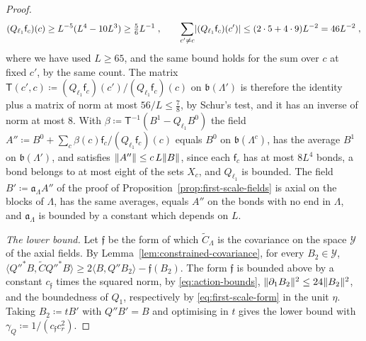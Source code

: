 \documentclass[11pt]{preprint}
\DeclarePairedDelimiter{\abs}{\lvert}{\rvert}
\DeclarePairedDelimiter{\norm}{\lVert}{\rVert}
\numberwithin{equation}{section}
\theoremstyle{definition}
\theoremstyle{remark}
\theoremstyle{plain}
\begin{document}
\begin{proof}
\begin{equation}\label{eq:right-inverse-matrix}
    (Q_{\ell_1}\mathsf f_c)(c) \geq L^{-5}(L^4 - 10L^3) \geq \tfrac56L^{-1}\;,
    \qquad
    \sum_{c' \neq c}\abs{(Q_{\ell_1}\mathsf f_c)(c')} \leq (2 \cdot 5 + 4 \cdot 9)L^{-2} = 46L^{-2}\;,
\end{equation}
where we have used $L \geq 65$, and the same bound holds for the sum over $c$ at fixed $c'$, by the same count. The matrix $\mathsf T(c', c) \coloneqq (Q_{\ell_1}\mathsf f_c)(c')/(Q_{\ell_1}\mathsf f_c)(c)$ on $\mathfrak b(\Lambda')$ is therefore the identity plus a matrix of norm at most $56/L \leq \frac78$, by Schur's test, and it has an inverse of norm at most $8$. With $\beta \coloneqq \mathsf T^{-1}(B^1 - Q_{\ell_1}B^0)$ the field $A'' \coloneqq B^0 + \sum_c\beta(c)\mathsf f_c/(Q_{\ell_1}\mathsf f_c)(c)$ equals $B^0$ on $\mathfrak b(\Lambda^c)$, has the average $B^1$ on $\mathfrak b(\Lambda')$, and satisfies $\norm{A''} \leq c\,L\norm B$, since each $\mathsf f_c$ has at most $8L^4$ bonds, a bond belongs to at most eight of the sets $X_c$, and $Q_{\ell_1}$ is bounded. The field $B' \coloneqq \mathfrak a_\Lambda A''$ of the proof of Proposition~\ref{prop:first-scale-fields} is axial on the blocks of $\Lambda$, has the same averages, equals $A''$ on the bonds with no end in $\Lambda$, and $\mathfrak a_\Lambda$ is bounded by a constant which depends on $L$.

\emph{The lower bound.} Let $\mathfrak f$ be the form of which $\tilde C_\Lambda$ is the covariance on the space $\mathcal Y$ of the axial fields. By Lemma~\ref{lem:constrained-covariance}, for every $B_2 \in \mathcal Y$, $\langle Q''^*B, \tilde CQ''^*B\rangle \geq 2\langle B, Q''B_2\rangle - \mathfrak f(B_2)$. The form $\mathfrak f$ is bounded above by a constant $c_{\mathfrak f}$ times the squared norm, by \eqref{eq:action-bounds}, $\norm{\partial_1B_2}^2 \leq 24\norm{B_2}^2$, and the boundedness of $Q_1$, respectively by \eqref{eq:first-scale-form} in the unit $\eta$. Taking $B_2 \coloneqq tB'$ with $Q''B' = B$ and optimising in $t$ gives the lower bound with $\gamma_Q \coloneqq 1/(c_{\mathfrak f}c_r^2)$.
\end{proof}
\end{document}
